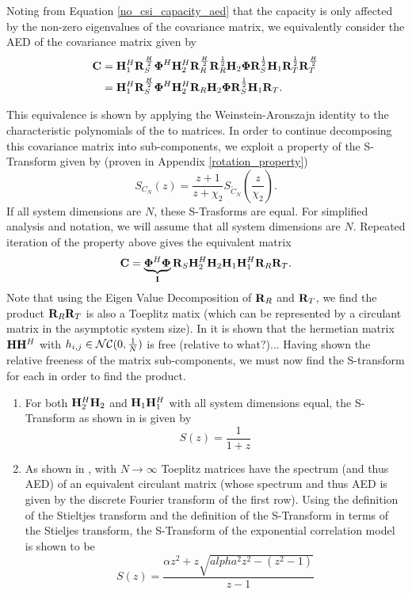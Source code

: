 Noting from Equation \eqref{no_csi_capacity_aed} that the capacity is only affected by the non-zero eigenvalues of the covariance matrix, we equivalently
consider the AED of the covariance matrix given by 
	\begin{align}
	\mathbf{C} &  =  \mathbf{H}_{1}^H \mathbf{R}_{S}^{\frac{H}{2}}\boldsymbol{\Phi}^H \mathbf{H}_{2}^H \mathbf{R}_{R}^{\frac{H}{2}}
	 \mathbf{R}_{R}^{\frac{1}{2}}\mathbf{H}_{2}\boldsymbol{\Phi} \mathbf{R}_{S}^{\frac{1}{2}}\mathbf{H}_{1}\mathbf{R}_{T}^{\frac{1}{2}}\mathbf{R}_{T}^{\frac{H}{2}}
	 \\
	 &  =  
	 \mathbf{H}_{1}^H \mathbf{R}_{S}^{\frac{H}{2}}\boldsymbol{\Phi}^H \mathbf{H}_{2}^H \mathbf{R}_{R}\mathbf{H}_{2}\boldsymbol{\Phi} \mathbf{R}_{S}^{\frac{1}{2}}\mathbf{H}_{1}\mathbf{R}_{T}.
	\end{align}

This equivalence is shown by applying the Weinstein-Aronszajn identity to the characteristic polynomials of the to matrices.
In order to continue decomposing this covariance matrix into sub-components, we exploit a property of the S-Transform given by (proven in Appendix \ref{rotation_property})
\begin{equation}
S_{C_N}(z) = \frac{z+1}{z+\chi_2} S_{\tilde{C}_N}(\frac{z}{\chi_2}).
\end{equation}
If all system dimensions are $N$, these S-Trasforms are equal. For simplified analysis and notation, we will assume that all system dimensions are $N$.
Repeated iteration of the property above gives the equivalent matrix
	\begin{equation}
	\mathbf{C} =
\underbrace{\boldsymbol{\Phi}^H \boldsymbol{\Phi}}_{\mathbf{I}}
	\mathbf{R}_{S}
	 \mathbf{H}_{2}^H \mathbf{H}_{2}
	 \mathbf{H}_{1}\mathbf{H}_{1}^H 
	  \mathbf{R}_{R}
	 \mathbf{R}_{T}.
	\end{equation}
Note that using the Eigen Value Decomposition of $\mathbf{R}_{R}$ and $\mathbf{R}_{T}$, we find the product $\mathbf{R}_{R} \mathbf{R}_{T}$ is also a Toeplitz matix (which can be represented by a circulant matrix in the asymptotic system size).
In \cite[Section 4.3.2]{muller2013applications} it is shown that the hermetian matrix $\mathbf{H}\mathbf{H}^H$ with $h_{i,j} \in \mathcal{NC}(0,\frac{1}{N})$
is free (relative to what?)...
Having shown the relative freeness of the matrix sub-components, we must now find the S-transform for each in order to find the product.
\begin{enumerate}
\item 
	For both $\mathbf{H}_{2}^H \mathbf{H}_{2}$ and $\mathbf{H}_{1}\mathbf{H}_{1}^H$ with all system dimensions equal, the S-Transform as shown in \cite{muller2002random} is given by 
	\begin{equation}
	S(z) = \frac{1}{1+z}
	\end{equation}
\item 
	As shown in \cite{gray2006toeplitz}, with $N \rightarrow \infty$ Toeplitz matrices have the spectrum (and thus AED) of an equivalent circulant matrix (whose spectrum and thus AED is given by the discrete Fourier transform of the first row). Using the definition of the Stieltjes transform and the definition of the S-Transform in terms of the Stieljes transform, the S-Transform of the exponential correlation model is shown to be \cite{skupch2005free}
	\begin{equation}
	S(z) = \frac{\alpha z^2 + z \sqrt{alpha^2 z^2 -(z^2-1)}}{z-1}
	\end{equation}
\end{enumerate}
